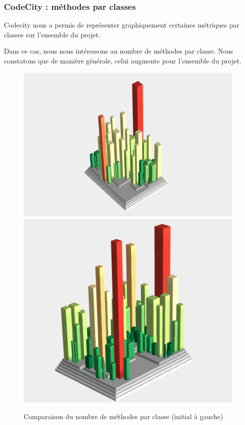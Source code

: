 \documentclass[a4paper,12pt]{report} %
\begin{document}
\subsubsection{CodeCity : méthodes par classes}
Codecity nous a permis de représenter graphiquement certaines métriques
par classes sur l'ensemble du projet.

Dans ce cas, nous nous intéressons au nombre de méthodes par classe. Nous constatons que de manière générale, celui augmente pour l'ensemble du projet.

\begin{figure}[!h]
\includegraphics[scale=0.5]{ressources/final_initial_declared_methods}\includegraphics[scale=0.5]{ressources/final_new_declared_methods}\caption{Comparaison du nombre de méthodes par classe (initial à gauche)}


\end{figure}
\end{document}
